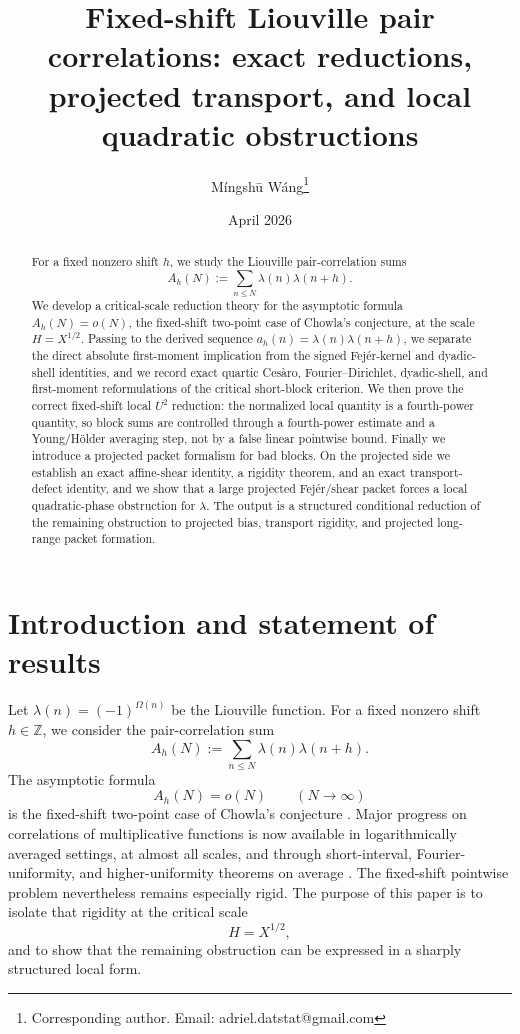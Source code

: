 \documentclass[11pt]{scrartcl}
\title{Fixed-shift Liouville pair correlations: exact reductions, projected transport, and local quadratic obstructions}
\author{Míngshū Wáng\thanks{Corresponding author. Email: adriel.datstat@gmail.com}}
\date{April 2026}
\numberwithin{equation}{section}
\theoremstyle{definition}
\newcommand{\Z}{\mathbb Z}
\newcommand{\1}{\mathbf 1}
\begin{document}
\maketitle

\begin{abstract}
For a fixed nonzero shift $h$, we study the Liouville pair-correlation sums
\[
A_h(N):=\sum_{n\le N}\lambda(n)\lambda(n+h).
\]
We develop a critical-scale reduction theory for the asymptotic formula $A_h(N)=o(N)$, the fixed-shift two-point case of Chowla's conjecture, at the scale $H=X^{1/2}$. Passing to the derived sequence $a_h(n)=\lambda(n)\lambda(n+h)$, we separate the direct absolute first-moment implication from the signed Fej\'er-kernel and dyadic-shell identities, and we record exact quartic Ces\`aro, Fourier--Dirichlet, dyadic-shell, and first-moment reformulations of the critical short-block criterion. We then prove the correct fixed-shift local $U^2$ reduction: the normalized local quantity is a fourth-power quantity, so block sums are controlled through a fourth-power estimate and a Young/H\"older averaging step, not by a false linear pointwise bound. Finally we introduce a projected packet formalism for bad blocks. On the projected side we establish an exact affine-shear identity, a rigidity theorem, and an exact transport-defect identity, and we show that a large projected Fej\'er/shear packet forces a local quadratic-phase obstruction for $\lambda$. The output is a structured conditional reduction of the remaining obstruction to projected bias, transport rigidity, and projected long-range packet formation.
\end{abstract}

\section{Introduction and statement of results}

Let $\lambda(n)=(-1)^{\Omega(n)}$ be the Liouville function. For a fixed nonzero shift $h\in\Z$, we consider the pair-correlation sum
\[
A_h(N):=\sum_{n\le N}\lambda(n)\lambda(n+h).
\]
The asymptotic formula
\[
A_h(N)=o(N)
\qquad (N\to\infty)
\]
is the fixed-shift two-point case of Chowla's conjecture \cite{chowla1965riemann}. Major progress on correlations of multiplicative functions is now available in logarithmically averaged settings, at almost all scales, and through short-interval, Fourier-uniformity, and higher-uniformity theorems on average \cite{tao2016logarithmically,taoteravainen2019almostall,matomaki2016multiplicative,matomaki2020fourier,matomaki2023higher,greentao2012mobiusnil,matomakiShao2021poly}. The fixed-shift pointwise problem nevertheless remains especially rigid. The purpose of this paper is to isolate that rigidity at the critical scale
\[
H=X^{1/2},
\]
and to show that the remaining obstruction can be expressed in a sharply structured local form.
\end{document}
